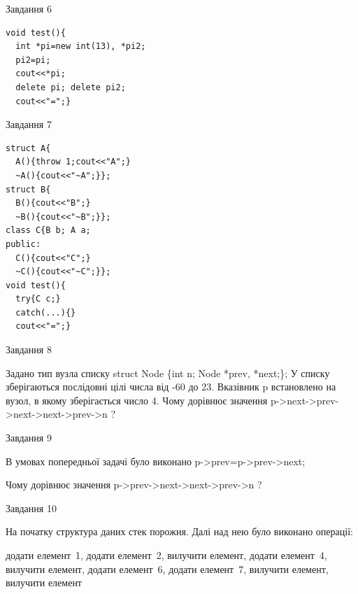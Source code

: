 \documentclass[12pt, ukrainian]{article}
\begin{document}
{{{{{{{{{{{{{{\begin{minipage}[t]{7cm}
               
{\begin{center}Завдання {6}\end{center}}
\vspace{-6mm}

\begin{verbatim}
void test(){
  int *pi=new int(13), *pi2;
  pi2=pi;
  cout<<*pi;
  delete pi; delete pi2;
  cout<<"=";}
\end{verbatim}            


               
{\begin{center}Завдання {7}\end{center}}
\vspace{-6mm}

\begin{verbatim}
struct A{
  A(){throw 1;cout<<"A";}
  ~A(){cout<<"~A";}};
struct B{
  B(){cout<<"B";}
  ~B(){cout<<"~B";}};
class C{B b; A a;
public:
  C(){cout<<"C";}
  ~C(){cout<<"~C";}};
void test(){
  try{C c;} 
  catch(...){} 
  cout<<"=";}
\end{verbatim}            


\end{minipage}
               
{\begin{center}Завдання {8}\end{center}}
\vspace{-6mm}
Задано тип вузла списку
struct Node \{int n; Node *prev, *next;\};
У списку зберігаються послідовні цілі числа від -60 до 23. Вказівник p встановлено на вузол, в якому зберігається число 4.
Чому дорівнює значення p->next->prev->next->next->prev->n ?\par

               
{\begin{center}Завдання {9}\end{center}}
\vspace{-6mm}
В умовах попередньої задачі було виконано p->prev=p->prev->next;

Чому дорівнює значення p->prev->next->next->prev->n ?\par

\newpage
               
{\begin{center}Завдання {10}\end{center}}
\vspace{-6mm}
На початку структура даних стек порожня. Далі над нею було виконано операції:

додати елемент~1, додати елемент~2, вилучити елемент, додати елемент~4, вилучити елемент, додати елемент~6, додати елемент~7, вилучити елемент, вилучити елемент

}}}}}}}}}}}}}}
\end{document}
